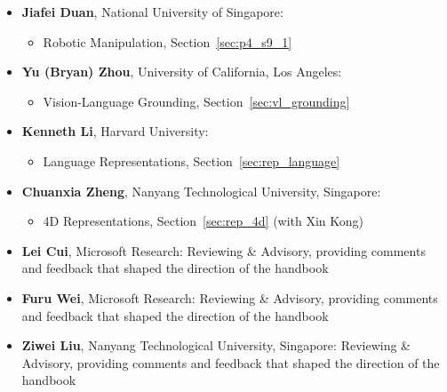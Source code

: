\begin{itemize}[leftmargin=*]
        \begin{itemize}
            \item Scene Classification, Section~\ref{sec:scene_classification} (with Hao Fei)
            \item Implicit Neural Spatial Reasoning, Section~\ref{subsec:p3_s7_2_1} (with Hao Fei)
            \item Explicit Structured Neural Reasoning, Section~\ref{subsec:p3_s7_2_2} (with Hao Fei)
            \item Geometry-aware Neural Spatial Reasoning, Section~\ref{subsec:p3_s7_2_3} (with Hao Fei)
            \item Code/DSL Generation for Spatial Reasoning, Section~\ref{subsec:p3_s7_3_4} (with Hao Fei)
        \end{itemize}
    \item \textbf{Jiafei Duan}, National University of Singapore:
        \begin{itemize}
            \item Robotic Manipulation, Section~\ref{sec:p4_s9_1}
        \end{itemize}
    \item \textbf{Yu (Bryan) Zhou}, University of California, Los Angeles:
        \begin{itemize}
            \item Vision-Language Grounding, Section~\ref{sec:vl_grounding}
        \end{itemize}
    \item \textbf{Kenneth Li}, Harvard University:
        \begin{itemize}
            \item Language Representations, Section~\ref{sec:rep_language}
        \end{itemize}
    \item \textbf{Chuanxia Zheng}, Nanyang Technological University, Singapore:
        \begin{itemize}
            \item 4D Representations, Section~\ref{sec:rep_4d} (with Xin Kong)
        \end{itemize}
    \item \textbf{Lei Cui}, Microsoft Research: Reviewing \& Advisory, providing comments and feedback that shaped the direction of the handbook
    \item \textbf{Furu Wei}, Microsoft Research: Reviewing \& Advisory, providing comments and feedback that shaped the direction of the handbook
    \item \textbf{Ziwei Liu}, Nanyang Technological University, Singapore: Reviewing \& Advisory, providing comments and feedback that shaped the direction of the handbook

\end{itemize}
